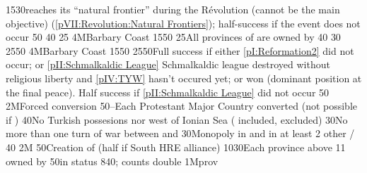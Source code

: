 {15}{30}{\paysmajeurFrance reaches its ``natural frontier'' during the
  Révolution (cannot be the main objective) (\ref{pVII:Revolution:Natural
    Frontiers}); half-success if the event does not occur}%
%
 
%
%
{}{50}{\EU@objNoFrenchVassal}%
%
%
{}{40}{\EU@objNoFrenchItaly}%
%
%
{}{25}{\EU@objSDCF}%
%
\EUobjective4M{Barbary Coast}{\Presidio}%
{15}{50}{\EU@objPresidiosHIS}%
%
%
{}{25}{All provinces of \paysprovincesne are owned by \paysmajeurEspagne}%
%
%
%
{}{40}{\EU@objNoFrenchVassal}%
%
%
{}{30}{\EU@objNoFrenchItaly}%
%
%
{25}{50}{}%
%
\EUobjective4M{Barbary Coast}{\Presidio}%
{15}{50}{\EU@objPresidiosHIS}%
%
%
{25}{50}{Full success if either \ref{pI:Reformation2} did not occur; or
  \ref{pII:Schmalkaldic League} Schmalkaldic league destroyed without
  religious liberty and \ref{pIV:TYW} hasn't occured yet; or
   won (dominant position at the final peace). Half success
  if \ref{pII:Schmalkaldic League} did not occur}%
%
%
%
{}{50}{\EU@objHalfHungary}%
%
\EUobjective2M{Forced conversion}{\MAJ}%
{50}{--}{Each Protestant Major Country converted (not possible if \CATHCO)}%
%
%
{}{40}{No Turkish possesions nor \VASSAL west of Ionian Sea
  ( included, \paystripoli excluded)}%
%
%
{}{30}{No more than one turn of war between  and
  }%
%
%
{}{30}{Monopoly in  and in at least 2 other \CTZ/\STZ}%
%
%
%
{}{40}{\EU@objHalfHungary}%
%
\EUobjective2M{}{}%
{}{50}{Creation of  (half if South HRE alliance)}%
%
%
{10}{30}{Each province above 11 owned by \AUSaus}%
%
%
{}{50}{\paysportugal in \ANNEXION status}%
%
%
{8}{40}{\EU@objMonopolyZone;  counts double}%
%
%
\EUobjective1M{\payshongrie}{\TUR prov}%

